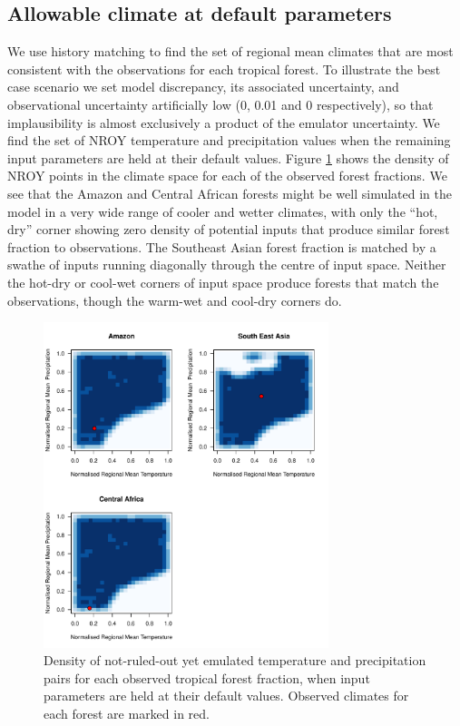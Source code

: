 \documentclass[gmd, manuscript]{copernicus}
\begin{document}
\subsection{Allowable climate at default parameters}\label{ssec:allowable}
We use history matching to find the set of regional mean climates that are most consistent with the observations for each tropical forest. To illustrate the best case scenario we set model discrepancy, its associated uncertainty, and observational uncertainty artificially low (0, 0.01 and 0 respectively), so that implausibility is almost exclusively a product of the emulator uncertainty. We find the set of NROY temperature and precipitation values when the remaining input parameters are held at their default values. Figure \ref{fig:nroy_climate} shows the density of NROY points in the climate space for each of the observed forest fractions. We see that the Amazon and Central African forests might be well simulated in the model in a very wide range of cooler and wetter climates, with only the ``hot, dry'' corner showing zero density of potential inputs that produce similar forest fraction to observations. The Southeast Asian forest fraction is matched by a swathe of inputs running diagonally through the centre of input space. Neither the hot-dry or cool-wet corners of input space produce forests that match the observations, though the warm-wet and cool-dry corners do.

\begin{figure}[t]
\includegraphics[width=8.3cm]{../graphics/nroy_climate.pdf}
\caption{Density of not-ruled-out yet emulated temperature and precipitation pairs for each observed tropical forest fraction, when input parameters are held at their default values. Observed climates for each forest are marked in red. 
}
\label{fig:nroy_climate}
\end{figure}
\end{document}
